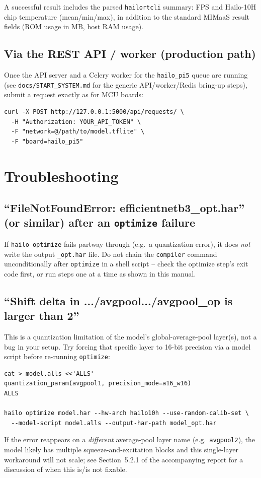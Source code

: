 \documentclass[11pt]{article}
\begin{document}
A successful result includes the parsed \texttt{hailortcli} summary: FPS and
Hailo-10H chip temperature (mean/min/max), in addition to the standard
MIMaaS result fields (ROM usage in MB, host RAM usage).

\subsection{Via the REST API / worker (production path)}
Once the API server and a Celery worker for the \texttt{hailo\_pi5} queue are
running (see \texttt{docs/START\_SYSTEM.md} for the generic API/worker/Redis
bring-up steps), submit a request exactly as for MCU boards:
\begin{lstlisting}
curl -X POST http://127.0.0.1:5000/api/requests/ \
  -H "Authorization: YOUR_API_TOKEN" \
  -F "network=@/path/to/model.tflite" \
  -F "board=hailo_pi5"
\end{lstlisting}

\section{Troubleshooting}

\subsection{``FileNotFoundError: efficientnetb3\_opt.har'' (or similar) after
an \texttt{optimize} failure}
If \texttt{hailo optimize} fails partway through (e.g.\ a quantization
error), it does \emph{not} write the output \texttt{\_opt.har} file. Do not
chain the \texttt{compiler} command unconditionally after
\texttt{optimize} in a shell script -- check the optimize step's exit code
first, or run steps one at a time as shown in this manual.

\subsection{``Shift delta in .../avgpool.../avgpool\_op is larger than 2''}
This is a quantization limitation of the model's global-average-pool layer(s),
not a bug in your setup. Try forcing that specific layer to 16-bit precision
via a model script before re-running \texttt{optimize}:
\begin{lstlisting}
cat > model.alls <<'ALLS'
quantization_param(avgpool1, precision_mode=a16_w16)
ALLS

hailo optimize model.har --hw-arch hailo10h --use-random-calib-set \
  --model-script model.alls --output-har-path model_opt.har
\end{lstlisting}
If the error reappears on a \emph{different} average-pool layer name (e.g.\
\texttt{avgpool2}), the model likely has multiple squeeze-and-excitation
blocks and this single-layer workaround will not scale; see Section~5.2.1 of
the accompanying report for a discussion of when this is/is not fixable.
\end{document}
